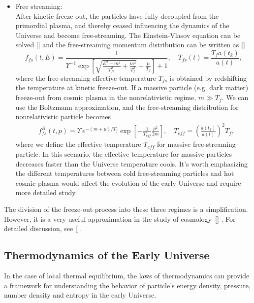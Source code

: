 \begin{itemize}
\item{Free streaming:}\\
After kinetic freeze-out, the particles have fully decoupled from the primordial plasma, and thereby ceased influencing the dynamics of the Universe and become free-streaming. The Einstein-Vlasov equation can be solved [\cite{choquet2008general}] and the free-streaming momentum distribution can be written as [\cite{Birrell:2012gg}]
\begin{equation}\label{free_stream_dist}
f_{fs}(t,E)=\frac{1}{\Upsilon^{-1}\exp{\left[\sqrt{\frac{E^2-m^2}{T_{fs}^2}+\frac{m^2}{T^2_f}}-\frac{\mu}{T_f}\right]+1}},\quad T_{fs}(t)=\frac{T_fa(t_k)}{a(t)},
\end{equation}
where the free-streaming effective temperature $T_{fs}$ is obtained by redshifting the temperature at kinetic freeze-out. If a massive particle (e.g. dark matter) freeze-out from cosmic plasma in the nonrelativistic regime, $m\gg T_f$. We can use the
Boltzmann approximation, and the free-streaming distribution for nonrelativistic particle becomes
\begin{align}
&f^B_{fs}(t,p)=\Upsilon\,e^{-(m+\mu)/T_f}\exp\left[-\frac{1}{ T_{eff}}\frac{p^2}{2m}\right],\quad T_{eff}=\left(\frac{a(t_f)}{a(t)}\right)^2T_f,
\end{align}
where we define the effective temperature $T_{eff}$ for massive free-streaming particle. In this scenario, the effective temperature for massive particles decreases faster than the Universe temperature cools. It's worth emphasizing the different temperatures between cold free-streaming particles and hot cosmic plasma would affect the evolution of the early Universe and require more detailed study. 
\end{itemize}

The division of the freeze-out process into these three regimes is a simplification. However, it is a very useful approximation in the study of cosmology~[\cite{Mangano:2005cc,Birrell:2014gea}] . For detailed discussion, see [\cite{Birrell:2012gg,Rafelski:2023emw}].




\subsection{Thermodynamics of the Early Universe}
In the case of local thermal equilibrium, the laws of thermodynamics can provide a framework for understanding the behavior of particle's energy density, pressure, number density and entropy in the early Universe.

